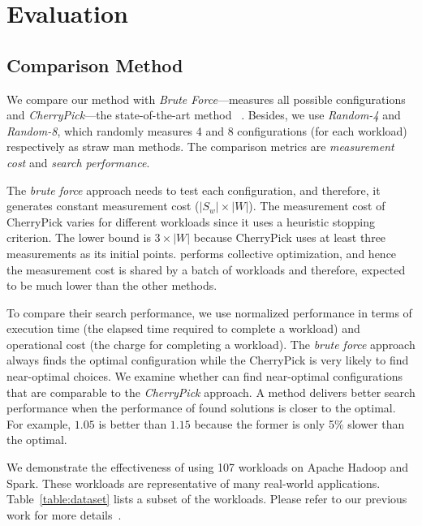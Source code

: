 \section{Evaluation}
\label{sec:evaluation}


\subsection{Comparison Method}

We compare our method with \emph{Brute Force}---measures all possible configurations and \emph{CherryPick}---the state-of-the-art method
~\cite{Alipourfard2017}.
Besides, we use  \emph{Random-4} and \emph{Random-8}, which randomly measures 4 and 8 configurations (for each workload) respectively as straw man methods.
The comparison metrics are  \emph{measurement cost} and \emph{search performance}.

The \emph{brute force} approach needs to test each configuration, and therefore, it generates constant measurement cost ($|S_w| \times |W|$).
The measurement cost of CherryPick varies for different workloads since it uses a heuristic stopping criterion. The lower bound is $3\times |W|$ because CherryPick uses at least three measurements as its initial points.
\micky performs collective optimization, and hence the measurement cost is shared by a batch of workloads and therefore, expected to be much lower than the other methods.

To compare their search performance, we use normalized performance in terms of execution time (the elapsed time required to complete a workload) and operational cost (the charge for completing a workload).
The \emph{brute force} approach always finds the optimal configuration while
the CherryPick is very likely to find near-optimal choices.
We examine whether \micky can find near-optimal configurations that are comparable to the \emph{CherryPick} approach.
A method delivers better search performance when the performance of found solutions is closer to the optimal.
For example, $1.05$ is better than $1.15$ because the former is only 5\% slower than the optimal.

We demonstrate the effectiveness of \micky using 107 workloads on Apache Hadoop and Spark.
These workloads are representative of many real-world applications.
Table~\ref{table:dataset} lists a subset of the workloads.
Please refer to our previous work for more details~\cite{Hsu2018Arrow, Hsu2018Scout, scoutdataset}.


